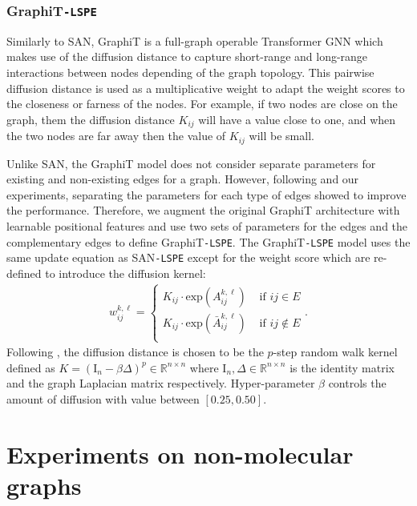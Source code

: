 \documentclass{article} \usepackage{iclr2021_conference,times}
\begin{document}
\subsubsection{GraphiT\texttt{-LSPE}}
\label{sec:graphit_lspe}

Similarly to SAN, GraphiT \citep{mialon2021graphit} is a full-graph operable Transformer GNN which makes use of the diffusion distance to capture short-range and long-range interactions between nodes depending of the graph topology. This pairwise diffusion distance is used as a multiplicative weight to adapt the weight scores to the closeness or farness of the nodes. For example, if two nodes are close on the graph, them the diffusion distance $K_{ij}$ will have a value close to one, and when the two nodes are far away then the value of $K_{ij}$ will be small. 

Unlike SAN, the GraphiT model does not consider separate parameters for existing and non-existing edges for a graph. However, following \cite{kreuzer2021rethinking} and our experiments,  separating the parameters for each type of edges showed to improve the performance. Therefore, we augment the original GraphiT architecture with learnable positional features and use two sets of parameters for the edges and the complementary edges to define GraphiT\texttt{-LSPE}. The GraphiT\texttt{-LSPE} model uses the same update equation as SAN\texttt{-LSPE} except for the weight score which are re-defined to introduce the diffusion kernel:
\begin{eqnarray}
w_{ij}^{k,\ell}=\left\{\begin{array}{ll}
K_{ij} \cdot \text{exp}(A_{ij}^{k,\ell}) & \textrm{ if } ij\in E  \\
K_{ij} \cdot \text{exp}(\bar{A}_{ij}^{k,\ell}) & \textrm{ if } ij\not\in E \\
\end{array}\right..\label{eqn:san_lspe_3a_graphit}
\end{eqnarray}
Following \citep{mialon2021graphit}, the diffusion distance is chosen to be the $p$-step random walk kernel defined as $K = (\textrm{I}_n - \beta \Delta)^p \in \mathbb{R}^{n \times n}$ where $\textrm{I}_n, \Delta \in \mathbb{R}^{n \times n}$ is the identity matrix and the graph Laplacian matrix respectively. Hyper-parameter $\beta$ controls the amount of diffusion with value between $[0.25,0.50]$. 

 



\section{Experiments on non-molecular graphs}
\label{sec:experiments_non_molecular}
\end{document}
